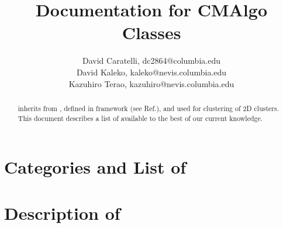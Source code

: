 \documentclass[a4paper,12pt]{report}
\begin{document}
\title{Documentation for CMAlgo Classes}
\author{
  David Caratelli, dc2864@columbia.edu

  David Kaleko, kaleko@nevis.columbia.edu

  Kazuhiro Terao, kazuhiro@nevis.columbia.edu
}
\maketitle

\begin{abstract}
{\cmalgo} inherits from {\cbalgo}, defined in {\cmtool} framework (see Ref.\cite{CMTool}), and used for clustering of 2D clusters. This document describes a list of available {\cmalgo} to the best of our current knowledge. 
\end{abstract}

\tableofcontents

\newpage
\chapter{Categories and List of {\cmalgo}}
\label{chap:list}


\chapter{Description of {\cmalgo}}
\label{chap:desc}





\end{document}
